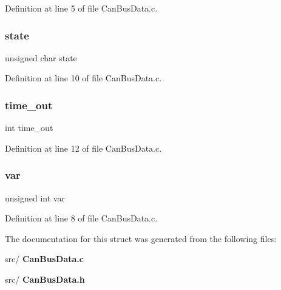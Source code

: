 Definition at line 5 of file Can\+Bus\+Data.\+c.

\mbox{\label{structsdo_ab12828525693568ae9c217805bea1ef9}} 
\subsubsection{state}
{\footnotesize\ttfamily unsigned char state}



Definition at line 10 of file Can\+Bus\+Data.\+c.

\mbox{\label{structsdo_ae15e94adb1c654c998b8c2dfb1934756}} 
\subsubsection{time\+\_\+out}
{\footnotesize\ttfamily int time\+\_\+out}



Definition at line 12 of file Can\+Bus\+Data.\+c.

\mbox{\label{structsdo_abc8d85dd818b176f05fc87d8cf773156}} 
\subsubsection{var}
{\footnotesize\ttfamily unsigned int var}



Definition at line 8 of file Can\+Bus\+Data.\+c.



The documentation for this struct was generated from the following files\+:\begin{DoxyCompactItemize}
\item 
src/\textbf{ Can\+Bus\+Data.\+c}\item 
src/\textbf{ Can\+Bus\+Data.\+h}\end{DoxyCompactItemize}
